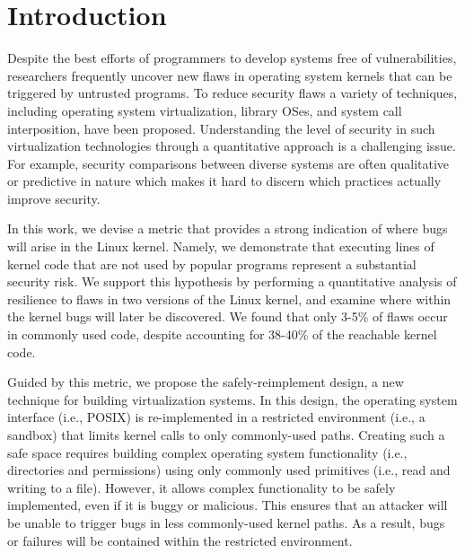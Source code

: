 \section{Introduction}
\label{sec.introduction}

Despite the best efforts of programmers to develop systems free of vulnerabilities,
researchers frequently uncover new flaws in operating system kernels that can be
triggered by untrusted programs. To reduce security flaws
a variety of techniques, including operating system virtualization, library OSes,
and system call interposition, have been proposed. Understanding the level of security in such virtualization technologies through a quantitative approach is a challenging issue. For example, security comparisons between diverse systems are often qualitative or predictive in nature which makes it hard to discern which practices actually improve security.


In this work, we devise a metric that provides a strong indication of where bugs will arise in the Linux kernel. Namely, we demonstrate
that executing lines of kernel code that are not used by popular programs represent
a substantial security risk. We support this hypothesis by performing a quantitative
 analysis of resilience to flaws in two versions of the Linux kernel, and examine
where within the kernel bugs will later be discovered. We found that only 3-5\%
  of flaws occur in commonly used code, despite accounting for
 38-40\%  of the reachable kernel code.

Guided by this metric, we propose the safely-reimplement design, a new
technique for building virtualization systems. In this design, the operating
system interface (i.e., POSIX) is re-implemented in a restricted environment
(i.e., a sandbox) that limits kernel calls to only commonly-used paths.
Creating such a safe space requires building complex operating system functionality
(i.e., directories and permissions) using only commonly used primitives (i.e.,
read and writing to a file). However, it allows complex functionality to be safely
implemented, even if it is buggy or malicious. 
This ensures that an attacker will be unable to trigger bugs in less 
commonly-used kernel paths. As a result, bugs or failures
will be contained within the restricted environment.

